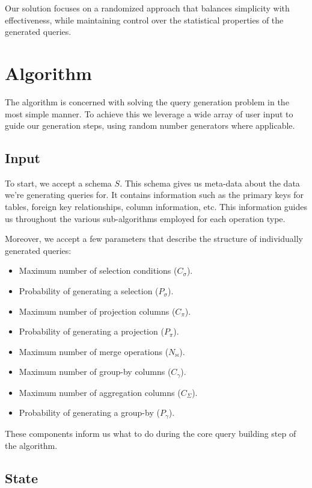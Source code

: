 \documentclass[10pt, twocolumn]{article}
\begin{document}
\noindent
Our solution focuses on a randomized approach that balances
simplicity with effectiveness, while maintaining control over
the statistical properties of the generated queries.

\section{Algorithm}

The algorithm is concerned with solving the query generation problem in the most simple manner. To achieve this we leverage a wide array of user input to guide our generation steps, using random number generators where applicable.

\subsection*{Input}

To start, we accept a schema $S$. This schema gives us meta-data about the data we're generating queries for. It contains information such as the primary keys for tables, foreign key relationships, column information, etc. This information guides us throughout the various sub-algorithms employed for each operation type.

\spacing
\noindent
Moreover, we accept a few parameters that describe the structure of individually generated queries:

\begin{itemize}
  \item Maximum number of selection conditions ($C_{\sigma}$).
  \item Probability of generating a selection ($P_{\sigma}$).
  \item Maximum number of projection columns ($C_{\pi}$).
  \item Probability of generating a projection ($P_{\pi}$).
  \item Maximum number of merge operations ($N_{\bowtie}$).
  \item Maximum number of group-by columns ($C_{\gamma}$).
  \item Maximum number of aggregation columns ($C_{\Sigma}$).
  \item Probability of generating a group-by ($P_{\gamma}$).
\end{itemize}

\noindent
These components inform us what to do during the core query building step of the algorithm.

\subsection*{State}
\end{document}
